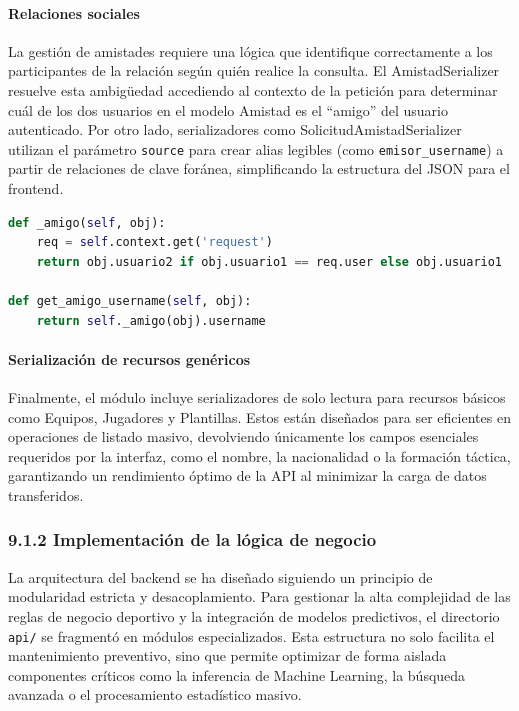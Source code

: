 \paragraph{Relaciones sociales}
 
La gestión de amistades requiere una lógica que identifique correctamente a los participantes de la relación
según quién realice la consulta. El AmistadSerializer resuelve esta ambigüedad accediendo al contexto de la
petición para determinar cuál de los dos usuarios en el modelo Amistad es el ``amigo'' del usuario
autenticado. Por otro lado, serializadores como SolicitudAmistadSerializer utilizan el parámetro \texttt{source}
para crear alias legibles (como \texttt{emisor\_username}) a partir de relaciones de clave foránea, simplificando
la estructura del JSON para el frontend.
 
\begin{lstlisting}[language=Python,caption={Resolución ambigua de relaciones sociales en serializers mediante context}]
def _amigo(self, obj):
    req = self.context.get('request')
    return obj.usuario2 if obj.usuario1 == req.user else obj.usuario1
 
def get_amigo_username(self, obj):
    return self._amigo(obj).username
\end{lstlisting}
 
\paragraph{Serialización de recursos genéricos}
 
Finalmente, el módulo incluye serializadores de solo lectura para recursos básicos como Equipos,
Jugadores y Plantillas. Estos están diseñados para ser eficientes en operaciones de listado masivo,
devolviendo únicamente los campos esenciales requeridos por la interfaz, como el nombre, la nacionalidad
o la formación táctica, garantizando un rendimiento óptimo de la API al minimizar la carga de datos transferidos.
 
\subsubsection{9.1.2 Implementación de la lógica de negocio}
 
La arquitectura del backend se ha diseñado siguiendo un principio de modularidad estricta y desacoplamiento.
Para gestionar la alta complejidad de las reglas de negocio deportivo y la integración de modelos predictivos,
el directorio \texttt{api/} se fragmentó en módulos especializados. Esta estructura no solo facilita el mantenimiento preventivo,
sino que permite optimizar de forma aislada componentes críticos como la inferencia de Machine Learning, la búsqueda avanzada o el procesamiento estadístico masivo.
 
